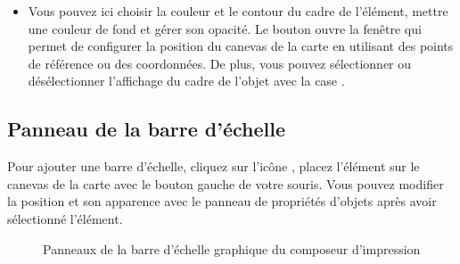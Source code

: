 \begin{itemize}[label=--]
\item Vous pouvez ici choisir la couleur et le contour du cadre de l'élément, mettre une couleur de fond et gérer son opacité. Le bouton  ouvre la fenêtre  qui permet de configurer la position du canevas de la carte en utilisant des points de référence ou des coordonnées. De plus, vous pouvez sélectionner ou désélectionner l'affichage du cadre de l'objet avec la case .
\end{itemize}

\subsection{Panneau de la barre d'échelle}

Pour ajouter une barre d'échelle, cliquez sur l'icône , placez l'élément sur le canevas de la carte avec le bouton gauche de votre souris. Vous pouvez modifier la position et son apparence avec le panneau de propriétés d'objets après avoir sélectionné l'élément.

\begin{figure}[ht]
\centering
{}
\hspace{1cm}
\caption{Panneaux de la barre d'échelle graphique du composeur d'impression \nixcaption}\label{fig:scalebaroptions}
\end{figure}

